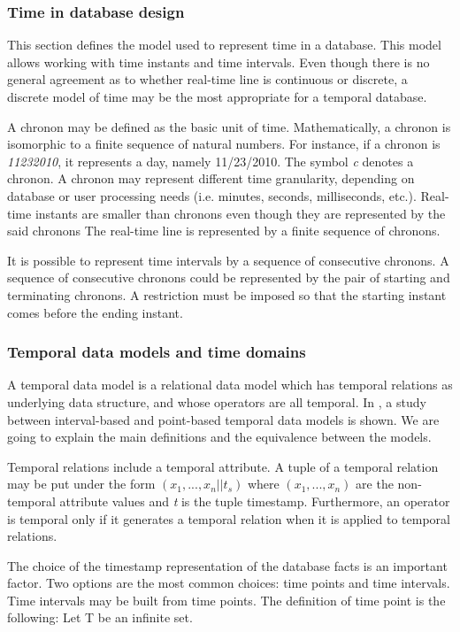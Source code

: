 \subsubsection{Time in database design}
\label{sec:timeindatabasedesign}
This section defines the model used to represent time in a database. This model allows working with time instants and time intervals.  Even though there is no general agreement as to whether real-time line is continuous or discrete, a discrete model of time may be the most appropriate for a temporal database. 

	A chronon may be defined as the basic unit of time. Mathematically, a chronon is isomorphic to a finite sequence of natural numbers. For instance, if a chronon is \emph{11232010}, it represents a day, namely 11/23/2010. The symbol \emph{c} denotes a chronon. A chronon may represent different time granularity, depending on database or user processing needs (i.e. minutes, seconds, milliseconds, etc.). Real-time instants are smaller than chronons even though they are represented by the said chronons The real-time line is represented by a finite sequence of chronons. 

	It is possible to represent time intervals by a sequence of consecutive chronons. A sequence of consecutive chronons could be represented by the pair of starting and terminating chronons. A restriction must be imposed so that the starting instant comes before the ending instant.
\subsubsection{Temporal data models and time domains}
\label{sec:temporaldatamodelsandtimedomains}
A temporal data model is a relational data model which has temporal relations as underlying data structure, and whose operators are all temporal. In \cite{Böhlen_point-versus}, a study between interval-based and point-based temporal data models is shown. We are going to explain the main definitions and the equivalence between the models.

Temporal relations include a temporal attribute. A tuple of a temporal relation may be put under the form $(x_1,...,x_n||t_s)$ where $(x_1,...,x_n)$ are the non-temporal attribute values and \emph{t} is the tuple timestamp. Furthermore, an operator is temporal only if it generates a temporal relation when it is applied to temporal relations.

	The choice of the timestamp representation of the database facts is an important factor. Two options are the most common choices: time points and time intervals. Time intervals may be built from time points. The definition of time point is the following:
Let T be an infinite set.

